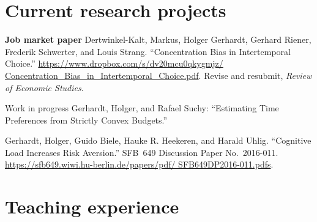 \documentclass[11pt, a4paper, titleabove]{simplecv}
\begin{document}
\section{Current research projects}

\begin{topic}

	\item [\textbf{Job market paper}]
	Dertwinkel-Kalt, Markus, Holger Gerhardt, Gerhard Riener, \mbox{Frederik} Schwerter, and Louis Strang. ``Concentration Bias in \mbox{Intertemporal} Choice.'' \url{https://www.dropbox.com/s/dv20mcu0qkygmjz/ Concentration_Bias_in_Intertemporal_Choice.pdf}. Revise and resubmit, \textit{Review of Economic Studies}.

	\item[Work in progress]
	Gerhardt, Holger, and Rafael Suchy: ``Estimating Time Preferences from Strictly Convex Budgets.''
	
	Gerhardt, Holger, Guido Biele, Hauke R. Heekeren, and Harald \mbox{Uhlig}. ``Cognitive Load Increases Risk Aversion.'' SFB~649 \mbox{Discussion} Paper No.~2016-011. \url{https://sfb649.wiwi.hu-berlin.de/papers/pdf/ SFB649DP2016-011.pdfs}.
\end{topic}


\section{Teaching experience}
\end{document}
